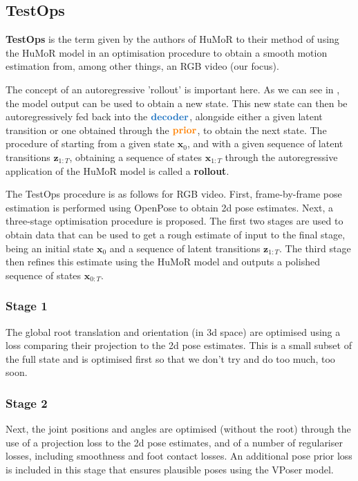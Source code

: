 \subsection{TestOps}
\label{sec:humor_test_ops}

\textbf{TestOps} is the term given by the authors of HuMoR to their method of using the HuMoR model in an optimisation procedure to obtain a smooth motion estimation from, among other things, an RGB video (our focus).

The concept of an autoregressive 'rollout' is important here. As we can see in , the model output can be used to obtain a new state. This new state can then be autoregressively fed back into the $\textbf{\textcolor{RoyalBlue}{decoder}}$, alongside either a given latent transition or one obtained through the $\textbf{\textcolor{orange}{prior}}$, to obtain the next state. The procedure of starting from a given state $\mathbf{x}_0$, and with a given sequence of latent transitions $\textbf{z}_{1:T}$, obtaining a sequence of states $\mathbf{x}_{1:T}$ through the autoregressive application of the HuMoR model is called a \textbf{rollout}.

The TestOps procedure is as follows for RGB video. First, frame-by-frame pose estimation is performed using OpenPose \cite{openPose} to obtain 2d pose estimates. Next, a three-stage optimisation procedure is proposed. The first two stages are used to obtain data that can be used to get a rough estimate of input to the final stage, being an initial state $\mathbf{x}_0$ and a sequence of latent transitions $\textbf{z}_{1:T}$. The third stage then refines this estimate using the HuMoR model and outputs a polished sequence of states $\textbf{x}_{0:T}$.

\subsubsection{Stage 1}
The global root translation and orientation (in 3d space) are optimised using a loss comparing their projection to the 2d pose estimates. This is a small subset of the full state and is optimised first so that we don't try and do too much, too soon.

\subsubsection{Stage 2}
\label{sec:humor_stage_2}
Next, the joint positions and angles are optimised (without the root) through the use of a projection loss to the 2d pose estimates, and of a number of regulariser losses, including smoothness and foot contact losses. An additional pose prior loss is included in this stage that ensures plausible poses using the VPoser \cite{VPoser} model. 

